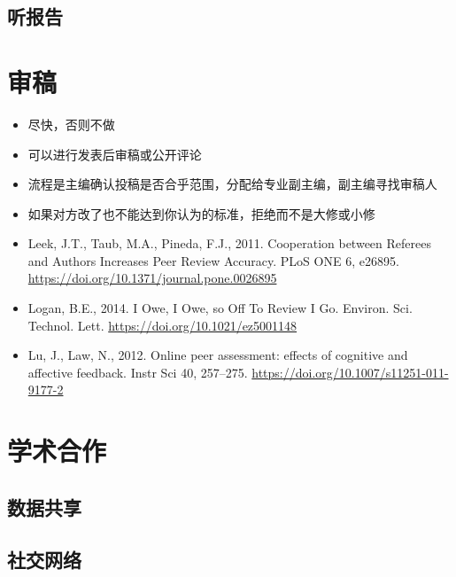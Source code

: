 \documentclass[]{book}
\begin{document}
\subsection{听报告}

\section{审稿}

\begin{itemize}
\item
  尽快，否则不做
\item
  可以进行发表后审稿或公开评论
\item
  流程是主编确认投稿是否合乎范围，分配给专业副主编，副主编寻找审稿人
\item
  如果对方改了也不能达到你认为的标准，拒绝而不是大修或小修
\item
  Leek, J.T., Taub, M.A., Pineda, F.J., 2011. Cooperation between
  Referees and Authors Increases Peer Review Accuracy. PLoS ONE 6,
  e26895. \url{https://doi.org/10.1371/journal.pone.0026895}
\item
  Logan, B.E., 2014. I Owe, I Owe, so Off To Review I Go. Environ. Sci.
  Technol. Lett. \url{https://doi.org/10.1021/ez5001148}
\item
  Lu, J., Law, N., 2012. Online peer assessment: effects of cognitive
  and affective feedback. Instr Sci 40, 257--275.
  \url{https://doi.org/10.1007/s11251-011-9177-2}
\end{itemize}

\section{学术合作}

\subsection{数据共享}

\subsection{社交网络}
\end{document}
